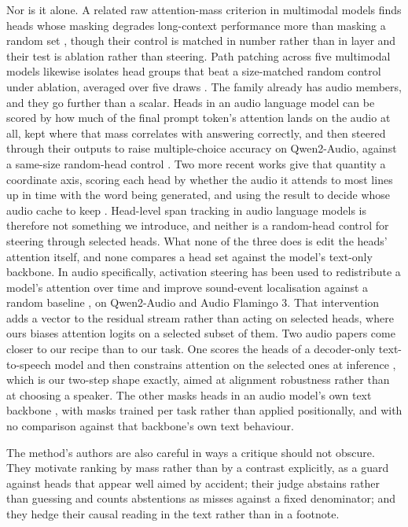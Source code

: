 \documentclass[11pt]{article}
\begin{document}
Nor is it alone. A related raw attention-mass criterion in multimodal models
finds heads whose masking degrades long-context performance more than masking a
random set \citep{core2026heads}, though their control is matched in number
rather than in layer and their test is ablation rather than steering. Path
patching across five multimodal models likewise isolates head groups that beat a
size-matched random control under ablation, averaged over five draws
\citep{modalityconflict2026}. The
family already has audio members, and they go further than a scalar. Heads in an
audio language model can be scored by how much of the final prompt token's
attention lands on the audio at all, kept where that mass correlates with
answering correctly, and then steered through their outputs to raise
multiple-choice accuracy on Qwen2-Audio, against a same-size random-head control
\citep{audiospecialistheads}. Two more recent works give that quantity a
coordinate axis, scoring each head by whether the audio it attends to most lines
up in time with the word being generated, and using the result to decide whose
audio cache to keep \citep{audiokv2026, wnw2026}. Head-level span tracking in
audio language models is therefore not something we introduce, and neither is a
random-head control for steering through selected heads. What none of the three
does is edit the heads' attention itself, and none compares a head set against
the model's text-only backbone. In audio
specifically, activation steering has been used to redistribute a model's
attention over time and improve sound-event localisation against a random
baseline \citep{steeringwheretolisten}, on Qwen2-Audio and Audio Flamingo 3. That
intervention adds a vector to the residual stream rather than acting on selected
heads, where ours biases attention logits on a selected subset of them. Two audio papers come
closer to our recipe than to our task. One scores the heads of a decoder-only
text-to-speech model and then constrains attention on the selected ones at
inference \citep{alignmentmaps2024}, which is our two-step shape exactly, aimed
at alignment robustness rather than at choosing a speaker. The other masks heads
in an audio model's own text backbone \citep{ahamask2026}, with masks trained
per task rather than applied positionally, and with no comparison against that
backbone's own text behaviour.

The method's authors are also careful in ways a critique should not obscure. They
motivate ranking by mass rather than by a contrast explicitly, as a guard against
heads that appear well aimed by accident; their judge abstains rather than
guessing and counts abstentions as misses against a fixed denominator; and they
hedge their causal reading in the text rather than in a footnote.
\end{document}
